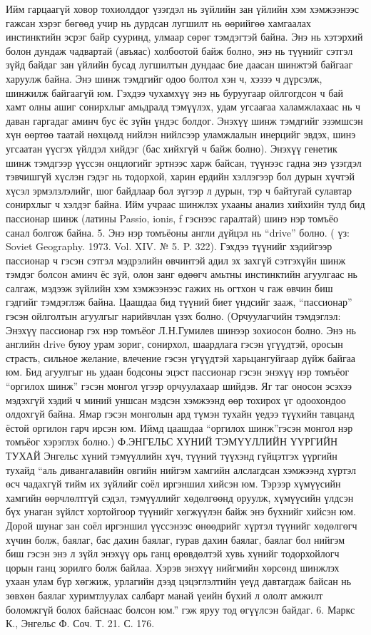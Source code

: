 Ийм гарцаагүй ховор тохиолддог үзэгдэл нь зүйлийн зан үйлийн хэм хэмжээнээс гажсан хэрэг бөгөөд учир нь дурдсан лугшилт нь өөрийгөө хамгаалах инстинктийн эсрэг байр сууринд, улмаар сөрөг тэмдэгтэй байна. Энэ нь хэтэрхий болон дундаж чадвартай (авъяас) холбоотой байж болно, энэ нь түүнийг сэтгэл зүйд байдаг зан үйлийн бусад лугшилтын дундаас бие даасан шинжтэй байгааг харуулж байна. Энэ шинж тэмдгийг одоо болтол хэн ч, хэзээ ч дүрсэлж, шинжилж байгаагүй юм. Гэхдээ чухамхүү энэ нь буруугаар ойлгогдсон ч бай хамт олны ашиг сонирхлыг амьдралд тэмүүлэх, удам угсаагаа халамжлахаас нь ч даван гаргадаг аминч бус ёс зүйн үндэс болдог. Энэхүү шинж тэмдгийг эзэмшсэн хүн өөртөө таатай нөхцөлд нийлэн нийлсээр уламжлалын инерцийг эвдэх, шинэ угсаатан үүсгэх үйлдэл хийдэг (бас хийхгүй ч байж болно).
Энэхүү генетик шинж тэмдгээр үүссэн онцлогийг эртнээс харж байсан, түүнээс гадна энэ үзэгдэл тэвчишгүй хүслэн гэдэг нь тодорхой, харин ердийн хэллэгээр бол дурын хүчтэй хүсэл эрмэлзлэлийг, шог байдлаар бол зүгээр л дурын, тэр ч байтугай сулавтар сонирхлыг ч хэлдэг байна. Ийм учраас шинжлэх ухааны анализ хийхийн тулд бид пассионар шинж (латины Passio, ionis, f гэснээс гаралтай) шинэ нэр томъёо санал болгож байна. 5. Энэ нэр томъёоны англи дүйцэл нь “drive” болно. ( үз: Soviet Geography. 1973. Vol. XIV. № 5. P. 322).
Гэхдээ түүнийг хэдийгээр пассионар ч гэсэн сэтгэл мэдрэлийн өвчинтэй адил эх захгүй сэтгэхүйн шинж тэмдэг болсон аминч ёс зүй, олон занг өдөөгч амьтны инстинктийн агуулгаас нь салгаж, мэдээж зүйлийн хэм хэмжээнээс гажих нь огтхон ч гаж өвчин биш гэдгийг тэмдэглэж байна. Цаашдаа бид түүний биет үндсийг зааж, “пассионар” гэсэн ойлголтын агуулгыг нарийвчлан үзэх болно.
(Орчуулагчийн тэмдэглэл: Энэхүү пассионар гэх нэр томъёог Л.Н.Гумилев шинээр зохиосон болно. Энэ нь английн drive буюу урам зориг, сонирхол, шаардлага гэсэн үгүүдтэй, оросын страсть, сильное желание, влечение гэсэн үгүүдтэй харьцангуйгаар дүйж байгаа юм. Бид агуулгыг нь удаан бодсоны эцэст пассионар гэсэн энэхүү нэр томъёог “оргилох шинж” гэсэн монгол үгээр орчуулахаар шийдэв. Яг таг оносон эсэхээ мэдэхгүй хэдий ч миний уншсан мэдсэн хэмжээнд өөр тохирох үг одоохондоо олдохгүй байна. Ямар гэсэн монголын ард түмэн тухайн үедээ түүхийн тавцанд ёстой оргилон гарч ирсэн юм. Иймд цаашдаа “оргилох шинж”гэсэн монгол нэр томъёог хэрэглэх болно.)
Ф.ЭНГЕЛЬС ХҮНИЙ ТЭМҮҮЛЛИЙН ҮҮРГИЙН ТУХАЙ
Энгельс хүний тэмүүллийн хүч, түүний түүхэнд гүйцэтгэх үүргийн тухайд “аль дивангалавийн овгийн нийгэм хамгийн алслагдсан хэмжээнд хүртэл өсч чадахгүй тийм их зүйлийг соёл иргэншил хийсэн юм. Тэрээр хүмүүсийн хамгийн өөрчлөлтгүй сэдэл, тэмүүллийг хөдөлгөөнд оруулж, хүмүүсийн үлдсэн бүх унаган зүйлст хортойгоор түүнийг хөгжүүлэн байж энэ бүхнийг хийсэн юм. Дорой шунаг зан соёл иргэншил үүссэнээс өнөөдрийг хүртэл түүнийг хөдөлгөгч хүчин болж, баялаг, бас дахин баялаг, гурав дахин баялаг, баялаг бол нийгэм биш гэсэн энэ л зүйл энэхүү орь ганц өрөвдөлтэй хувь хүнийг тодорхойлогч цорын ганц зорилго болж байлаа. Хэрэв энэхүү нийгмийн хөрсөнд шинжлэх ухаан улам бүр хөгжиж, урлагийн дээд цэцэглэлтийн үеүд давтагдаж байсан нь зөвхөн баялаг хуримтлуулах салбарт манай үеийн бүхий л ололт амжилт боломжгүй болох байснаас болсон юм.” гэж яруу тод өгүүлсэн байдаг. 6. Маркс К., Энгельс Ф. Соч. Т. 21. С. 176.
